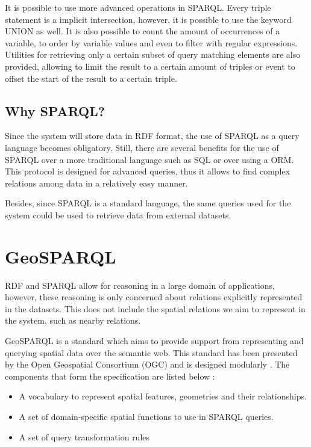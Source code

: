 It is possible to use more advanced operations in SPARQL. Every triple statement is a implicit intersection, however, it is possible to use the keyword UNION as well. It is also possible to count the amount of occurrences of a variable, to order by variable values and even to filter with regular expressions. Utilities for retrieving only a certain subset of query matching elements are also provided, allowing to limit the result to a certain amount of triples or event to offset the start of the result to a certain triple.

\subsection*{Why SPARQL?}

Since the system will store data in RDF format, the use of SPARQL as a query language becomes obligatory. Still, there are several benefits for the use of SPARQL over a more traditional language such as SQL or over using a ORM. This protocol is designed for advanced queries, thus it allows to find complex relations among data in a relatively easy manner. 

Besides, since SPARQL is a standard language, the same queries used for the system could be used to retrieve data from external datasets.

\section{GeoSPARQL}\label{sec:geosparql}

RDF and SPARQL allow for reasoning in a large domain of applications, however, these reasoning is only concerned about relations explicitly represented in the datasets. This does not include the spatial relations we aim to represent in the system, such as nearby relations.

GeoSPARQL is a standard which aims to provide support from representing and querying spatial data over the semantic web. This standard has been presented by the Open Geospatial Consortium (OGC) and is designed modularly \cite{geosparqlspec, battle2012enabling}. The components that form the specification are listed below \cite{battle2011linking}:

\begin{itemize}
	\item A vocabulary to represent spatial features, geometries and their relationships.
	\item A set of domain-specific spatial functions to use in SPARQL queries.
	\item A set of query transformation rules
\end{itemize}

